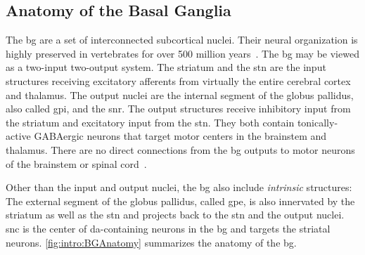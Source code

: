 \subsection{Anatomy of the Basal Ganglia}
\label{intro:BGAnatomy}
The \gls{bg} are a set of interconnected subcortical nuclei.
Their neural organization is highly preserved in vertebrates for over 500 million years~\cite{Grillner2016BG}.
The \gls{bg} may be viewed as a two-input two-output system.
The striatum and the \gls{stn} are the input structures receiving excitatory afferents from virtually the entire cerebral cortex and thalamus.
The output nuclei are the internal segment of the globus pallidus, also called \gls{gpi}, and the \gls{snr}.
The output structures receive inhibitory input from the striatum and excitatory input from the \gls{stn}.
They both contain tonically-active GABAergic neurons that target motor centers in the brainstem and thalamus.
There are no direct connections from the \gls{bg} outputs to motor neurons of the brainstem or spinal cord~\cite{Mink1996}.
\par
Other than the input and output nuclei, the \gls{bg} also include \emph{intrinsic} structures:
The external segment of the globus pallidus, called \gls{gpe}, is also innervated by the striatum as well as the \gls{stn} and projects back to the \gls{stn} and the output nuclei.
\Gls{snc} is the center of \gls{da}-containing neurons in the \gls{bg} and targets the striatal neurons.
\autoref{fig:intro:BGAnatomy} summarizes the anatomy of the \gls{bg}.


